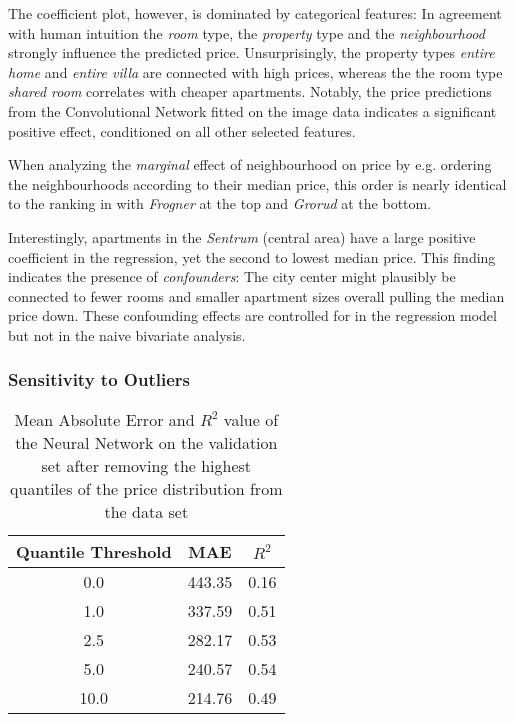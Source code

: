 The coefficient plot, however, is dominated by categorical features:
In agreement with human intuition the \emph{room} type, the \emph{property} type and the \emph{neighbourhood} strongly influence the predicted price.
Unsurprisingly, the property types \emph{entire home} and \emph{entire villa} are connected with high prices, whereas the the room type \emph{shared room} correlates with cheaper apartments.
Notably, the price predictions from the Convolutional Network fitted on the image data indicates a significant positive effect, conditioned on all other selected features.

When analyzing the \emph{marginal} effect of neighbourhood on price by e.g. ordering the neighbourhoods according to their median price, this order is nearly identical to the ranking in  with \emph{Frogner} at the top and \emph{Grorud} at the bottom.

Interestingly, apartments in the \emph{Sentrum} (central area) have a large positive coefficient in the regression, yet the second to lowest median price.
This finding indicates the presence of \emph{confounders}:
The city center might plausibly be connected to fewer rooms and smaller apartment sizes overall pulling the median price down.
These confounding effects are controlled for in the regression model but not in the naive bivariate analysis.


\subsubsection{Sensitivity to Outliers} \label{outliers}

\begin{table}[t]
  \centering
  \begin{tabular}{@{}ccc@{}}
    \toprule
    Quantile Threshold & MAE    & $R^2$ \\ \midrule
    0.0                & 443.35 & 0.16  \\
    1.0                & 337.59 & 0.51  \\
    2.5                & 282.17 & 0.53  \\
    5.0                & 240.57 & 0.54  \\
    10.0               & 214.76 & 0.49  \\ \bottomrule
  \end{tabular}
  \caption{Mean Absolute Error and $R^2$ value of the Neural Network on the validation set after removing the highest quantiles of the price distribution from the data set}
  \label{tab:mlp-outliers}
\end{table}

